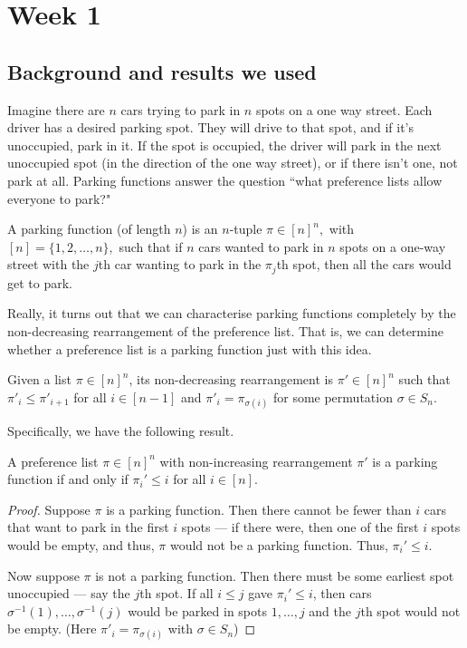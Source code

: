 \section{Week 1}

\subsection*{Background and results we used}

Imagine there are $n$ cars trying to park in $n$ spots on a one way street. Each driver has a desired parking spot. They will drive to that spot, and if it's unoccupied, park in it. If the spot is occupied, the driver will park in the next unoccupied spot (in the direction of the one way street), or if there isn't one, not park at all. Parking functions answer the question ``what preference lists allow everyone to park?"

\begin{definition}
    A parking function (of length $n$) is an $n$-tuple $\pi \in [n]^n,$ with $[n]=\{1,2,\ldots,n\},$ such that if $n$ cars wanted to park in $n$ spots on a one-way street with the $j$th car wanting to park in the $\pi_{j}$th spot, then all the cars would get to park.

\end{definition}

Really, it turns out that we can characterise parking functions completely by the non-decreasing rearrangement of the preference list. That is, we can determine whether a preference list is a parking function just with this idea.

\begin{definition}
    Given a list $\pi \in [n]^n$, its non-decreasing rearrangement is $\pi' \in [n]^n$ such that $\pi'_{i} \le \pi'_{i + 1}$ for all $i \in [n - 1]$ and $\pi'_{i} = \pi_{\sigma(i)}$ for some permutation $\sigma \in S_{n}$.
\end{definition}

Specifically, we have the following result.

\begin{proposition}
    A preference list $\pi \in [n]^n$ with non-increasing rearrangement $\pi'$ is a parking function if and only if $\pi_{i}' \le i$ for all $i \in [n]$.
\end{proposition}

\begin{proof}
    Suppose $\pi$ is a parking function. Then there cannot be fewer than $i$ cars that want to park in the first $i$ spots --- if there were, then one of the first $i$ spots would be empty, and thus, $\pi$ would not be a parking function. Thus, $\pi_{i}' \le i$.
    
    Now suppose $\pi$ is not a parking function. Then there must be some earliest spot unoccupied --- say the $j$th spot. If all $i \le j$ gave $\pi_{i}' \le i$, then cars $\sigma ^{-1}(1), \dots, \sigma ^{-1}(j)$ would be parked in spots $1, \dots, j$ and the $j$th spot would not be empty. (Here $\pi'_i = \pi_{\sigma(i)}$ with $\sigma \in S_n$)
\end{proof}

